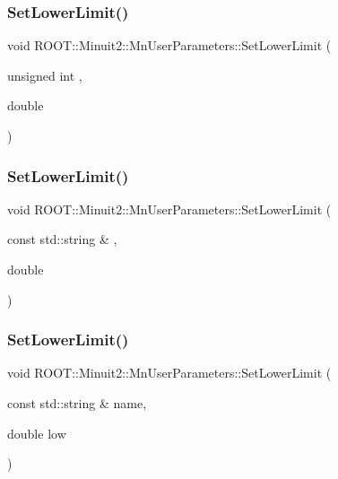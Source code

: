 \subsubsection{\texorpdfstring{SetLowerLimit()}{SetLowerLimit()}\hspace{0.1cm}{\footnotesize\ttfamily [2/4]}}
{\footnotesize\ttfamily void R\+O\+O\+T\+::\+Minuit2\+::\+Mn\+User\+Parameters\+::\+Set\+Lower\+Limit (\begin{DoxyParamCaption}\item[{unsigned int}]{,  }\item[{double}]{ }\end{DoxyParamCaption})}

\mbox{\label{classROOT_1_1Minuit2_1_1MnUserParameters_a3423d925b9a4b455c6130fa19f66adb4}} 
\subsubsection{\texorpdfstring{SetLowerLimit()}{SetLowerLimit()}\hspace{0.1cm}{\footnotesize\ttfamily [3/4]}}
{\footnotesize\ttfamily void R\+O\+O\+T\+::\+Minuit2\+::\+Mn\+User\+Parameters\+::\+Set\+Lower\+Limit (\begin{DoxyParamCaption}\item[{const std\+::string \&}]{,  }\item[{double}]{ }\end{DoxyParamCaption})}

\mbox{\label{classROOT_1_1Minuit2_1_1MnUserParameters_a3423d925b9a4b455c6130fa19f66adb4}} 
\subsubsection{\texorpdfstring{SetLowerLimit()}{SetLowerLimit()}\hspace{0.1cm}{\footnotesize\ttfamily [4/4]}}
{\footnotesize\ttfamily void R\+O\+O\+T\+::\+Minuit2\+::\+Mn\+User\+Parameters\+::\+Set\+Lower\+Limit (\begin{DoxyParamCaption}\item[{const std\+::string \&}]{name,  }\item[{double}]{low }\end{DoxyParamCaption})}

